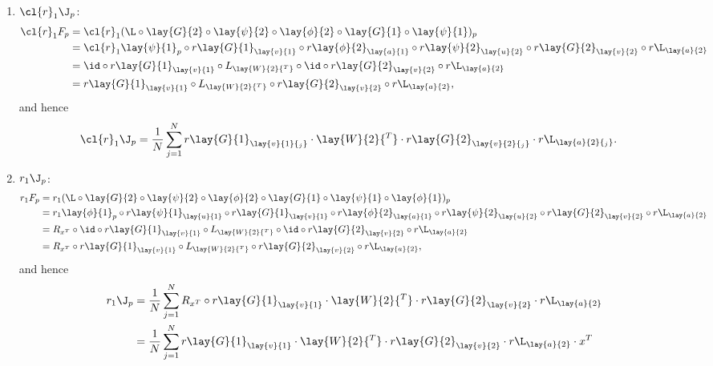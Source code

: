 \begin{enumerate}
	\item $\cl{r}_1\J_p$:
	\begin{align*}
		\cl{r}_1F_p&=\cl{r}_1(\L\circ\lay{G}{2}\circ\lay{\psi}{2}\circ\lay{\phi}{2}\circ\lay{G}{1}\circ\lay{\psi}{1})_p\\
		&=\cl{r}_1\lay{\psi}{1}_p\circ r\lay{G}{1}_{\lay{v}{1}}\circ r\lay{\phi}{2}_{\lay{a}{1}}\circ r\lay{\psi}{2}_{\lay{u}{2}}\circ r\lay{G}{2}_{\lay{v}{2}}\circ r\L_{\lay{a}{2}}\\
		&=\id\circ r\lay{G}{1}_{\lay{v}{1}}\circ L_{\lay{W}{2}{^T}}\circ\id\circ r\lay{G}{2}_{\lay{v}{2}}\circ r\L_{\lay{a}{2}}\\
		&=r\lay{G}{1}_{\lay{v}{1}}\circ L_{\lay{W}{2}{^T}}\circ r\lay{G}{2}_{\lay{v}{2}}\circ r\L_{\lay{a}{2}},
	\end{align*}
	and hence
	\begin{align*}
		\cl{r}_1\J_p&=\frac{1}{N}\sum_{j=1}^Nr\lay{G}{1}_{\lay{v}{1}{_j}}\cdot\lay{W}{2}{^T}\cdot r\lay{G}{2}_{\lay{v}{2}{_j}}\cdot r\L_{\lay{a}{2}{_j}}.
	\end{align*}
	
	\item $r_1\J_p$:
	\begin{align*}
		r_1F_p&=r_1(\L\circ\lay{G}{2}\circ\lay{\psi}{2}\circ\lay{\phi}{2}\circ\lay{G}{1}\circ\lay{\psi}{1}\circ\lay{\phi}{1})_p\\
		&=r_1\lay{\phi}{1}_p\circ r\lay{\psi}{1}_{\lay{u}{1}}\circ r\lay{G}{1}_{\lay{v}{1}}\circ r\lay{\phi}{2}_{\lay{a}{1}}\circ r\lay{\psi}{2}_{\lay{u}{2}}\circ r\lay{G}{2}_{\lay{v}{2}}\circ r\L_{\lay{a}{2}}\\
		&=R_{x^T}\circ\id\circ r\lay{G}{1}_{\lay{v}{1}}\circ L_{\lay{W}{2}{^T}}\circ\id\circ r\lay{G}{2}_{\lay{v}{2}}\circ r\L_{\lay{a}{2}}\\
		&=R_{x^T}\circ r\lay{G}{1}_{\lay{v}{1}}\circ L_{\lay{W}{2}{^T}}\circ r\lay{G}{2}_{\lay{v}{2}}\circ r\L_{\lay{a}{2}},
	\end{align*}
	and hence
	\begin{align*}
		r_1\J_p&=\frac{1}{N}\sum_{j=1}^NR_{x^T}\circ r\lay{G}{1}_{\lay{v}{1}}\cdot\lay{W}{2}{^T}\cdot r\lay{G}{2}_{\lay{v}{2}}\cdot r\L_{\lay{a}{2}}\\
		&=\frac{1}{N}\sum_{j=1}^Nr\lay{G}{1}_{\lay{v}{1}}\cdot\lay{W}{2}{^T}\cdot r\lay{G}{2}_{\lay{v}{2}}\cdot r\L_{\lay{a}{2}}\cdot x^T
	\end{align*}
\end{enumerate}


